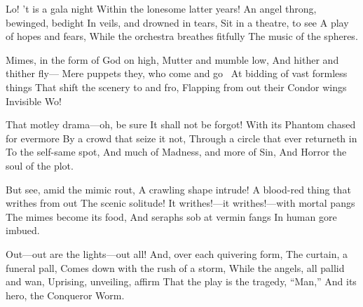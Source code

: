 \documentclass[fontsize=9, a5paper]{scrbook}
\begin{document}
\begin{poem}
	\begin{stanza}
		Lo! ’t is a gala night\verseline
		   \verseindent Within the lonesome latter years!   \verseline
		An angel throng, bewinged, bedight\verseline
		   \verseindent In veils, and drowned in tears,   \verseline
		Sit in a theatre, to see\verseline
		   \verseindent A play of hopes and fears,\verseline
		While the orchestra breathes fitfully   \verseline
		   \verseindent The music of the spheres.
	\end{stanza}
	
	\begin{stanza}
		Mimes, in the form of God on high,   \verseline
		   \verseindent Mutter and mumble low,\verseline
		And hither and thither fly—\verseline
		   \verseindent Mere puppets they, who come and go   \verseline\
		At bidding of vast formless things\verseline
		   \verseindent That shift the scenery to and fro,\verseline
		Flapping from out their Condor wings\verseline
		   \verseindent Invisible Wo!
	\end{stanza}
	
	\begin{stanza}
		That motley drama—oh, be sure   \verseline
		  \verseindent It shall not be forgot!\verseline
		With its Phantom chased for evermore   \verseline
		  \verseindent By a crowd that seize it not,\verseline
		Through a circle that ever returneth in   \verseline
		   \verseindent To the self-same spot,\verseline
		And much of Madness, and more of Sin,   \verseline
		  \verseindent And Horror the soul of the plot.
	\end{stanza}

	\pagebreak	

	\begin{stanza}
		But see, amid the mimic rout,\verseline
		  \verseindent A crawling shape intrude!\verseline
		A blood-red thing that writhes from out   \verseline
		  \verseindent The scenic solitude!\verseline
		It writhes!—it writhes!—with mortal pangs   \verseline
		The mimes become its food,\verseline
		And seraphs sob at vermin fangs\verseline
		  \verseindent In human gore imbued.
	\end{stanza}
	
	\begin{stanza}
		Out—out are the lights—out all!   \verseline
		  \verseindent And, over each quivering form,\verseline
		The curtain, a funeral pall,\verseline
		   Comes down with the rush of a storm,   \verseline
		While the angels, all pallid and wan,   \verseline
		   \verseindent Uprising, unveiling, affirm\verseline
		That the play is the tragedy, “Man,”   \verseline
		   \verseindent And its hero, the Conqueror Worm.
	\end{stanza}
\end{poem}
\end{document}

